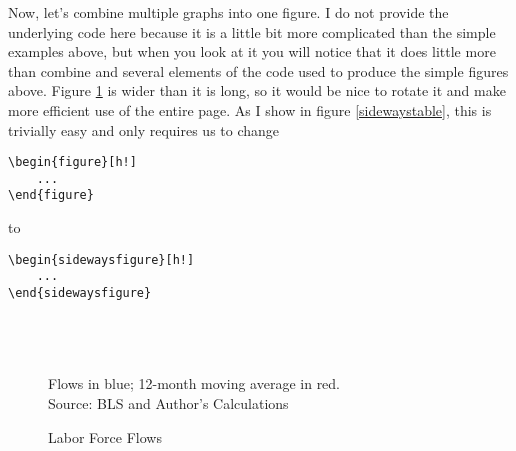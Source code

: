 \documentclass[11pt]{article}
\def\results{S:/trainings/LaTeX/results}
\begin{document}
Now, let's combine multiple graphs into one figure. I do not provide the underlying code here because it is a little bit more complicated than the simple examples above, but when you look at it you will notice that it does little more than combine and several elements of the code used to produce the simple figures above. Figure \ref{multipletable} is wider than it is long, so it would be nice to rotate it and make more efficient use of the entire page. As I show in figure \ref{sidewaystable}, this is trivially easy and only requires us to change
\begin{verbatim}
\begin{figure}[h!]
    ...
\end{figure}
\end{verbatim}
to
\begin{verbatim}
\begin{sidewaysfigure}[h!]
    ...
\end{sidewaysfigure}
\end{verbatim}

\begin{figure}[h!]
        \caption{Labor Force Flows}
        \centering
        \\
        \\
        \\
        \flushleft \footnotesize Flows in blue; 12-month moving average in red.\\ Source: BLS and Author's Calculations
        \label{multipletable}
\end{figure}
\end{document}
